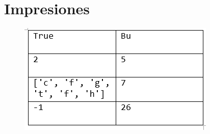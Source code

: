 \section{Impresiones}
\begin{figure}[h]
    \centering
    \includegraphics{Imagenes/impresiones.PNG}
\end{figure}